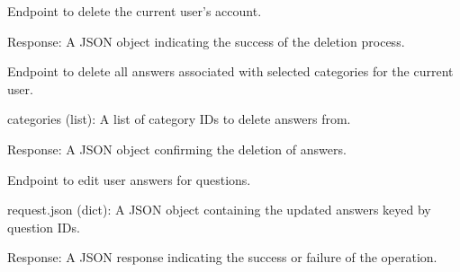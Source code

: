 \documentclass[letterpaper,10pt,english]{sphinxmanual}
\begin{document}

\begin{fulllineitems}
\label{\detokenize{routes.settings:routes.settings.routes.delete_account}}
\pysigstartsignatures
{}
\pysigstopsignatures
\sphinxAtStartPar
Endpoint to delete the current user’s account.
\begin{description}
\sphinxAtStartPar
Response: A JSON object indicating the success of the deletion process.

\end{description}

\end{fulllineitems}


\begin{fulllineitems}
\label{\detokenize{routes.settings:routes.settings.routes.delete_categories}}
\pysigstartsignatures
{}
\pysigstopsignatures
\sphinxAtStartPar
Endpoint to delete all answers associated with selected categories for the current user.
\begin{description}
\sphinxAtStartPar
categories (list): A list of category IDs to delete answers from.

\sphinxAtStartPar
Response: A JSON object confirming the deletion of answers.

\end{description}

\end{fulllineitems}


\begin{fulllineitems}
\label{\detokenize{routes.settings:routes.settings.routes.edit_answers}}
\pysigstartsignatures
{}
\pysigstopsignatures
\sphinxAtStartPar
Endpoint to edit user answers for questions.
\begin{description}
\sphinxAtStartPar
request.json (dict): A JSON object containing the updated answers keyed by question IDs.

\sphinxAtStartPar
Response: A JSON response indicating the success or failure of the operation.

\end{description}

\end{fulllineitems}
\end{document}
